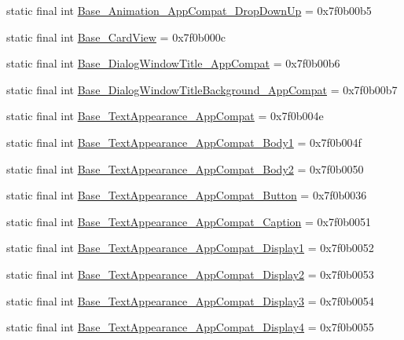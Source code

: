\begin{CompactItemize}
static final int \hyperlink{classcom_1_1companyname_1_1x__2doo_1_1_r_1_1style_acd155819de9e8dda2ad7d34d25250a0}{Base\_\-Animation\_\-AppCompat\_\-DropDownUp} = 0x7f0b00b5
\item 
static final int \hyperlink{classcom_1_1companyname_1_1x__2doo_1_1_r_1_1style_5c78af669b3fa209f0a9c2b3dc8696d4}{Base\_\-CardView} = 0x7f0b000c
\item 
static final int \hyperlink{classcom_1_1companyname_1_1x__2doo_1_1_r_1_1style_894dff14ea2433dd93c2f8084bdc4b34}{Base\_\-DialogWindowTitle\_\-AppCompat} = 0x7f0b00b6
\item 
static final int \hyperlink{classcom_1_1companyname_1_1x__2doo_1_1_r_1_1style_28195dafb59ade80ed82f43a47cbaccd}{Base\_\-DialogWindowTitleBackground\_\-AppCompat} = 0x7f0b00b7
\item 
static final int \hyperlink{classcom_1_1companyname_1_1x__2doo_1_1_r_1_1style_85dd9bfb19cc3e1f42b0a7dbd8f00df9}{Base\_\-TextAppearance\_\-AppCompat} = 0x7f0b004e
\item 
static final int \hyperlink{classcom_1_1companyname_1_1x__2doo_1_1_r_1_1style_d84f207f9601cfdcedcb6fe176c3d630}{Base\_\-TextAppearance\_\-AppCompat\_\-Body1} = 0x7f0b004f
\item 
static final int \hyperlink{classcom_1_1companyname_1_1x__2doo_1_1_r_1_1style_9f4bfe112d466948832cf9f67f7b23ec}{Base\_\-TextAppearance\_\-AppCompat\_\-Body2} = 0x7f0b0050
\item 
static final int \hyperlink{classcom_1_1companyname_1_1x__2doo_1_1_r_1_1style_2b57db96de21f86e5c901c1766e686a4}{Base\_\-TextAppearance\_\-AppCompat\_\-Button} = 0x7f0b0036
\item 
static final int \hyperlink{classcom_1_1companyname_1_1x__2doo_1_1_r_1_1style_bbc568b6268f493d95f0371f87d29370}{Base\_\-TextAppearance\_\-AppCompat\_\-Caption} = 0x7f0b0051
\item 
static final int \hyperlink{classcom_1_1companyname_1_1x__2doo_1_1_r_1_1style_97e44314058152f475caca596b9e3707}{Base\_\-TextAppearance\_\-AppCompat\_\-Display1} = 0x7f0b0052
\item 
static final int \hyperlink{classcom_1_1companyname_1_1x__2doo_1_1_r_1_1style_bb5aff4589e603b73396fb8c5381bd1c}{Base\_\-TextAppearance\_\-AppCompat\_\-Display2} = 0x7f0b0053
\item 
static final int \hyperlink{classcom_1_1companyname_1_1x__2doo_1_1_r_1_1style_05cb022ac52da655bdf0db81924e1f48}{Base\_\-TextAppearance\_\-AppCompat\_\-Display3} = 0x7f0b0054
\item 
static final int \hyperlink{classcom_1_1companyname_1_1x__2doo_1_1_r_1_1style_faa40ba24560b0c9c4e8e79a9f6ad55a}{Base\_\-TextAppearance\_\-AppCompat\_\-Display4} = 0x7f0b0055

\end{CompactItemize}
